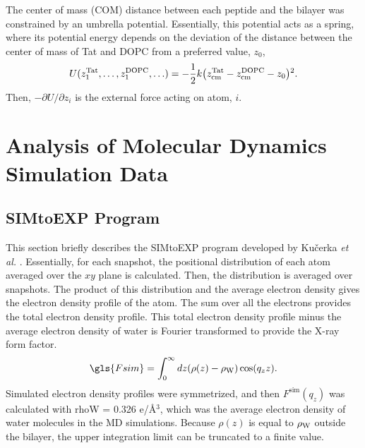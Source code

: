 The center of mass (COM) distance between each peptide and the bilayer was 
constrained by an umbrella potential. 
Essentially, this potential acts as a spring, 
where its potential energy depends on the deviation of the distance 
between the center of mass of Tat and DOPC from a preferred value, $z_0$,
\begin{equation*}
  U(z_1^{\textrm{Tat}},\ldots,z_1^{\textrm{DOPC}},\ldots) = 
  -\frac{1}{2} k 
  \mathopen{}\left( z_{\textrm{cm}}^{\textrm{Tat}} - z_{\textrm{cm}}^{\textrm{DOPC}} - z_0 \right)\mathclose{}^2.
\end{equation*}
Then, $-\partial U/\partial z_i$ is the external force acting 
on atom, $i$. 

\section{Analysis of Molecular Dynamics Simulation Data}
\subsection{SIMtoEXP Program}\label{sec:SIMtoEXP}
This section briefly describes the SIMtoEXP program
developed by Ku\v{c}erka \textit{et al.} \cite{Kucerka10}.
Essentially, for each snapshot, the positional distribution of each atom
averaged over the $xy$ plane is calculated. Then, the distribution is
averaged over snapshots. The product of this distribution and the average
electron density gives the electron density profile of the atom. The sum 
over all the electrons provides the total electron density profile. This total
electron density profile minus the average electron density of water
is Fourier transformed to provide the X-ray form factor.
\begin{equation}
  \gls{Fsim} = \int_0^\infty\dz (\rho(z)-\rhoW)\cos (q_zz).
\end{equation}
Simulated electron density profiles were symmetrized, and then
$F^\textrm{sim}(q_z)$ was calculated with \gls{rhoW} = 0.326 e/\AA$^3$,
which was the average electron density of water molecules in the MD simulations.
Because $\rho(z)$ is equal to $\rho_\textrm{W}$ outside the bilayer, the upper 
integration limit can be truncated to a finite value. 

